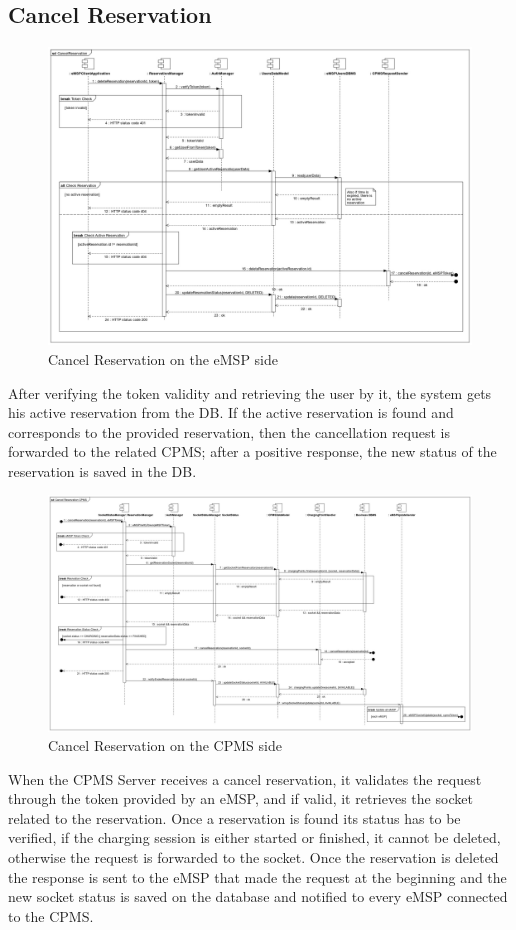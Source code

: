 \documentclass{Configuration_Files/PoliMi3i_thesis}
\begin{document}
\subsection{Cancel Reservation}
\begin{figure}[H]
    \centering
    \includegraphics[width=1\textwidth]{Images/sequenceDiagrams/CancelReservation.jpg}
    \caption{Cancel Reservation on the eMSP side}
\end{figure}
After verifying the token validity and retrieving the user by it, the system gets his active reservation from the DB. If the active reservation is found and corresponds to the provided reservation, then the cancellation request is forwarded to the related CPMS;
after a positive response, the new status of the reservation is saved in the DB.

\begin{figure}[H]
    \centering
    \includegraphics[width=1\textwidth]{Images/sequenceDiagrams/Cancel Reservation CPMS.jpg}
    \caption{Cancel Reservation on the CPMS side}
\end{figure}
When the CPMS Server receives a cancel reservation, it validates the request through the token provided by an eMSP, and if valid, it retrieves the socket related to the reservation. Once a reservation is found its status has to be verified, if the charging session is either started or finished, it cannot be deleted, otherwise the request is forwarded to the socket.
Once the reservation is deleted the response is sent to the eMSP that made the request at the beginning and the new socket status is saved on the database and notified to every eMSP connected to the CPMS.
\end{document}
